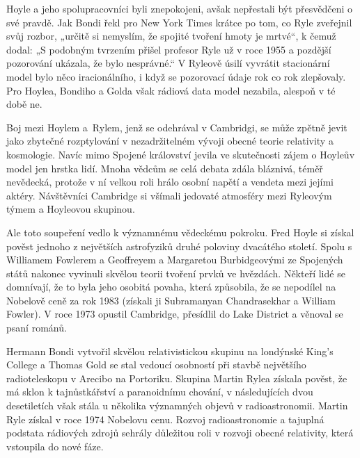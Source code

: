   Hoyle a jeho spolupracovníci byli znepokojeni, avšak nepřestali být přesvědčeni o své pravdě.
  Jak Bondi řekl pro New York Times krátce po tom, co Ryle zveřejnil svůj rozbor, „určitě si
  nemyslím, že spojité tvoření hmoty je mrtvé“, k čemuž dodal: „S podobným tvrzením přišel profesor
  Ryle už v roce 1955 a pozdější pozorování ukázala, že bylo nesprávné.“ V Ryleově úsilí vyvrátit
  stacionární model bylo něco iracionálního, i když se pozorovací údaje rok co rok zlepšovaly. Pro
  Hoylea, Bondiho a Golda však rádiová data model nezabila, alespoň v té době ne.

  Boj mezi Hoylem a Rylem, jenž se odehrával v Cambridgi, se může zpětně jevit jako zbytečné
  rozptylování v nezadržitelném vývoji obecné teorie relativity a kosmologie. Navíc mimo Spojené
  království jevila ve skutečnosti zájem o Hoyleův model jen hrstka lidí. Mnoha vědcům se celá
  debata zdála bláznivá, téměř nevědecká, protože v ní velkou roli hrálo osobní napětí a vendeta
  mezi jejími aktéry. Návštěvníci Cambridge si všímali jedovaté atmosféry mezi Ryleovým týmem a
  Hoyleovou skupinou. 

  Ale toto soupeření vedlo k významnému vědeckému pokroku. Fred Hoyle si získal pověst jednoho z
  největších astrofyziků druhé poloviny dvacátého století. Spolu s Williamem Fowlerem a Geoffreyem a
  Margaretou Burbidgeovými ze Spojených států nakonec vyvinuli skvělou teorii tvoření prvků ve
  hvězdách. Někteří lidé se domnívají, že to byla jeho osobitá povaha, která způsobila, že se
  nepodílel na Nobelově ceně za rok 1983 (získali ji Subramanyan Chandrasekhar a William Fowler). V
  roce 1973 opustil Cambridge, přesídlil do Lake District a věnoval se psaní románů. 

  Hermann Bondi vytvořil skvělou relativistickou skupinu na londýnské King’s College a Thomas Gold
  se stal vedoucí osobností při stavbě největšího radioteleskopu v Arecibo na Portoriku. Skupina
  Martin Rylea získala pověst, že má sklon k tajnůstkářství a paranoidnímu chování, v následujících
  dvou desetiletích však stála u několika významných objevů v radioastronomii. Martin Ryle získal
  v roce 1974 Nobelovu cenu. Rozvoj radioastronomie a tajuplná podstata rádiových zdrojů sehrály
  důležitou roli v rozvoji obecné relativity, která vstoupila do nové fáze.

